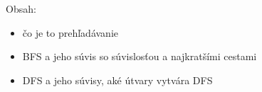 




Obsah:
\begin{itemize}
    \item čo je to prehľadávanie
    \item BFS a jeho súvis so súvislosťou a najkratšími cestami
    \item DFS a jeho súvisy, aké útvary vytvára DFS
\end{itemize}


